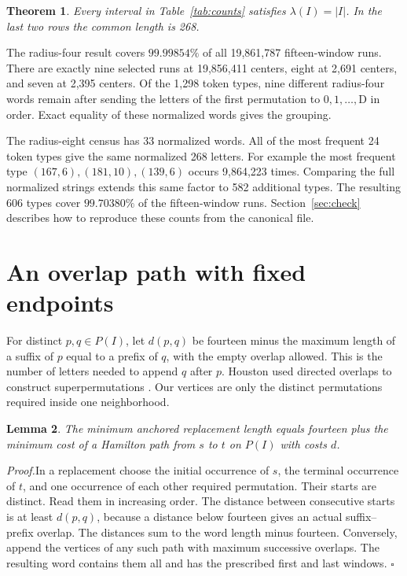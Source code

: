 \documentclass[11pt]{article}
\newtheorem{theorem}{Theorem}
\newtheorem{lemma}[theorem]{Lemma}
\newcommand{\startproof}{\par\noindent\textit{Proof.}\quad}
\newcommand{\proofdone}{\unskip\nobreak\hfill\(\square\)\par}
\begin{document}
\begin{theorem}\label{thm:local}
Every interval in Table~\ref{tab:counts} satisfies \(\lambda(I)=|I|\). In the last two rows the common length is 268.
\end{theorem}

The radius-four result covers \(99.99854\%\) of all 19,861,787 fifteen-window runs. There are exactly nine selected runs at 19,856,411 centers, eight at 2,691 centers, and seven at 2,395 centers. Of the 1,298 token types, nine different radius-four words remain after sending the letters of the first permutation to \(0,1,\ldots,\mathrm D\) in order. Exact equality of these normalized words gives the grouping.

The radius-eight census has 33 normalized words. All of the most frequent 24 token types give the same normalized 268 letters. For example the most frequent type \((167,6),(181,10),(139,6)\) occurs 9,864,223 times. Comparing the full normalized strings extends this same factor to 582 additional types. The resulting 606 types cover \(99.70380\%\) of the fifteen-window runs. Section~\ref{sec:check} describes how to reproduce these counts from the canonical file.

\clearpage
\section{An overlap path with fixed endpoints}\label{sec:path}
For distinct \(p,q\in P(I)\), let \(d(p,q)\) be fourteen minus the maximum length of a suffix of \(p\) equal to a prefix of \(q\), with the empty overlap allowed. This is the number of letters needed to append \(q\) after \(p\). Houston used directed overlaps to construct superpermutations \cite{houston}. Our vertices are only the distinct permutations required inside one neighborhood.

\begin{lemma}\label{lem:path}
The minimum anchored replacement length equals fourteen plus the minimum cost of a Hamilton path from \(s\) to \(t\) on \(P(I)\) with costs \(d\).
\end{lemma}
\startproof In a replacement choose the initial occurrence of \(s\), the terminal occurrence of \(t\), and one occurrence of each other required permutation. Their starts are distinct. Read them in increasing order. The distance between consecutive starts is at least \(d(p,q)\), because a distance below fourteen gives an actual suffix--prefix overlap. The distances sum to the word length minus fourteen. Conversely, append the vertices of any such path with maximum successive overlaps. The resulting word contains them all and has the prescribed first and last windows. \proofdone
\end{document}
